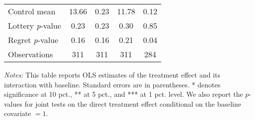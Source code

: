 \begin{table}[htbp]
{\begin{threeparttable}
\begin{tabular}{l*{4}{c}}
Control mean    &    13.66         &     0.23         &    11.78         &     0.12         \\
Lottery \emph{p}-value&     0.23         &     0.23         &     0.30         &     0.85         \\
Regret \emph{p}-value&     0.16         &     0.16         &     0.21         &     0.04         \\
Observations    &      311         &      311         &      311         &      284         \\
\bottomrule \end{tabular} \begin{tablenotes}[flushleft] \footnotesize \item \emph{Notes:} This table reports OLS estimates of the treatment effect and its interaction with baseline. Standard errors are in parentheses. * denotes significance at 10 pct., ** at 5 pct., and *** at 1 pct. level. We also report the \(p\)-values for joint tests on the direct treatment effect conditional on the baseline covariate $= 1$. \end{tablenotes} \end{threeparttable} } \end{table}


